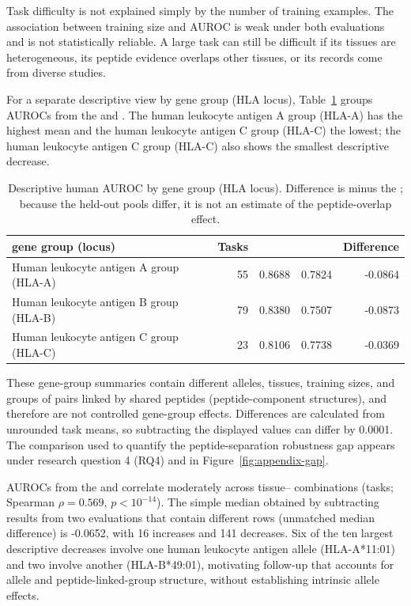 Task difficulty is not explained simply by the number of training examples. The association between training size and AUROC is weak under both evaluations and is not statistically reliable. A large task can still be difficult if its tissues are heterogeneous, its peptide evidence overlaps other tissues, or its records come from diverse studies.

For a separate descriptive view by \plainHLA{} gene group (HLA locus), Table~\ref{tab:human-hla-locus} groups AUROCs from the \plainFixedTest{} and \plainPeptideOOF{}. The human leukocyte antigen A group (HLA-A) has the highest \plainFixedTest{} mean and the human leukocyte antigen C group (HLA-C) the lowest; the human leukocyte antigen C group (HLA-C) also shows the smallest descriptive decrease.

\begin{table}[tbp]
\centering
\caption{Descriptive human AUROC by \plainHLA{} gene group (HLA locus). Difference is \plainPeptideOOF{} minus the \plainFixedTest{}; because the held-out pools differ, it is not an estimate of the peptide-overlap effect.}
\label{tab:human-hla-locus}
\footnotesize
\setlength{\tabcolsep}{3pt}
\begin{tabular}{lrrrr}
\toprule
\plainHLA{} gene group (locus) & Tasks & \plainFixedTest{} & \plainPeptideOOF{} & Difference \\ 
\midrule
Human leukocyte antigen A group (HLA-A) & 55 & 0.8688 & 0.7824 & -0.0864 \\ 
Human leukocyte antigen B group (HLA-B) & 79 & 0.8380 & 0.7507 & -0.0873 \\ 
Human leukocyte antigen C group (HLA-C) & 23 & 0.8106 & 0.7738 & -0.0369 \\ 
\bottomrule
\end{tabular}
\end{table}

These gene-group summaries contain different alleles, tissues, training sizes, and groups of pairs linked by shared peptides (peptide-component structures), and therefore are not controlled gene-group effects. Differences are calculated from unrounded task means, so subtracting the displayed values can differ by 0.0001. The \plainMatchedOOF{} comparison used to quantify the peptide-separation robustness gap appears under research question 4 (RQ4) and in Figure~\ref{fig:appendix-gap}.

AUROCs from the \plainFixedTest{} and \plainPeptideOOF{} correlate moderately across tissue--\plainHLA{} combinations (tasks; Spearman \(\rho=0.569\), \(p<10^{-14}\)). The simple median obtained by subtracting results from two evaluations that contain different rows (unmatched median difference) is -0.0652, with 16 increases and 141 decreases. Six of the ten largest descriptive decreases involve one human leukocyte antigen allele (HLA-A*11:01) and two involve another (HLA-B*49:01), motivating follow-up that accounts for allele and peptide-linked-group structure, without establishing intrinsic allele effects.

